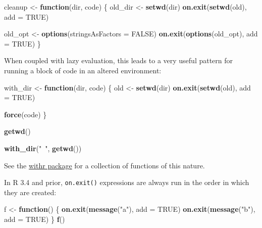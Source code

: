 \documentclass[]{book}
\newenvironment{Shaded}{\begin{snugshade}}{\end{snugshade}}
\newcommand{\KeywordTok}[1]{\textcolor[rgb]{0.13,0.29,0.53}{\textbf{#1}}}
\newcommand{\DataTypeTok}[1]{\textcolor[rgb]{0.13,0.29,0.53}{#1}}
\newcommand{\StringTok}[1]{\textcolor[rgb]{0.31,0.60,0.02}{#1}}
\newcommand{\OtherTok}[1]{\textcolor[rgb]{0.56,0.35,0.01}{#1}}
\newcommand{\ControlFlowTok}[1]{\textcolor[rgb]{0.13,0.29,0.53}{\textbf{#1}}}
\newcommand{\NormalTok}[1]{#1}
\theoremstyle{definition}
\theoremstyle{definition}
\theoremstyle{definition}
\theoremstyle{remark}
\begin{document}
\begin{Shaded}
\begin{Highlighting}[]
\NormalTok{cleanup <-}\StringTok{ }\ControlFlowTok{function}\NormalTok{(dir, code) \{}
\NormalTok{  old_dir <-}\StringTok{ }\KeywordTok{setwd}\NormalTok{(dir)}
  \KeywordTok{on.exit}\NormalTok{(}\KeywordTok{setwd}\NormalTok{(old), }\DataTypeTok{add =} \OtherTok{TRUE}\NormalTok{)}
  
\NormalTok{  old_opt <-}\StringTok{ }\KeywordTok{options}\NormalTok{(}\DataTypeTok{stringsAsFactors =} \OtherTok{FALSE}\NormalTok{)}
  \KeywordTok{on.exit}\NormalTok{(}\KeywordTok{options}\NormalTok{(old_opt), }\DataTypeTok{add =} \OtherTok{TRUE}\NormalTok{)}
\NormalTok{\}}
\end{Highlighting}
\end{Shaded}

When coupled with lazy evaluation, this leads to a very useful pattern
for running a block of code in an altered environment:

\begin{Shaded}
\begin{Highlighting}[]
\NormalTok{with_dir <-}\StringTok{ }\ControlFlowTok{function}\NormalTok{(dir, code) \{}
\NormalTok{  old <-}\StringTok{ }\KeywordTok{setwd}\NormalTok{(dir)}
  \KeywordTok{on.exit}\NormalTok{(}\KeywordTok{setwd}\NormalTok{(old), }\DataTypeTok{add =} \OtherTok{TRUE}\NormalTok{)}

  \KeywordTok{force}\NormalTok{(code)}
\NormalTok{\}}

\KeywordTok{getwd}\NormalTok{()}
\end{Highlighting}
\end{Shaded}

\begin{Shaded}
\begin{Highlighting}[]
\KeywordTok{with_dir}\NormalTok{(}\StringTok{"~"}\NormalTok{, }\KeywordTok{getwd}\NormalTok{())}
\end{Highlighting}
\end{Shaded}

See the \href{http://withr.r-lib.org}{withr package} for a collection of
functions of this nature.

In R 3.4 and prior, \texttt{on.exit()} expressions are always run in the
order in which they are created:

\begin{Shaded}
\begin{Highlighting}[]
\NormalTok{f <-}\StringTok{ }\ControlFlowTok{function}\NormalTok{() \{}
  \KeywordTok{on.exit}\NormalTok{(}\KeywordTok{message}\NormalTok{(}\StringTok{"a"}\NormalTok{), }\DataTypeTok{add =} \OtherTok{TRUE}\NormalTok{)}
  \KeywordTok{on.exit}\NormalTok{(}\KeywordTok{message}\NormalTok{(}\StringTok{"b"}\NormalTok{), }\DataTypeTok{add =} \OtherTok{TRUE}\NormalTok{)}
\NormalTok{\}}
\KeywordTok{f}\NormalTok{()}
\end{Highlighting}
\end{Shaded}
\end{document}
